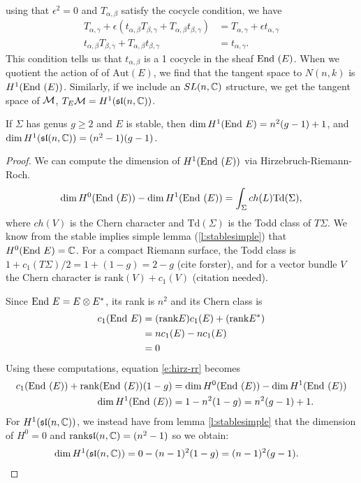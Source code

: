 	using that $\epsilon^2 = 0$ and $T_{\alpha,\beta}$ satisfy the cocycle condition, we have
	\begin{align*}
	T_{\alpha,\gamma} + \epsilon(t_{\alpha,\beta} T_{\beta,\gamma} + T_{\alpha,\beta} t_{\beta,\gamma}) &= T_{\alpha,\gamma} + \epsilon t_{\alpha,\gamma}\\
	t_{\alpha,\beta} T_{\beta,\gamma} + T_{\alpha,\beta} t_{\beta,\gamma} &= t_{\alpha,\gamma}.
	\end{align*}
	This condition tells us that $t_{\alpha,\beta}$ is a 1 cocycle in the sheaf $\text{End }(E)$. When we quotient the action of of $\text{Aut}(E)$, we find that the tangent space to $N(n,k)$ is $H^1(\text{End }(E))$. Similarly, if we include an $SL(n,\mathbb{C})$ structure, we get the tangent space of $\mathcal{M}$, $T_E\mathcal{M} = H^1(\mathfrak{sl}(n,\mathbb{C}))$.
	
	\begin{theorem}
		If $\Sigma$ has genus $g\geq 2$ and $E$ is stable, then $\dim H^1(\text{End } E) = n^2(g-1)+1$, and $\dim H^1(\mathfrak{sl}(n,\mathbb{C})) = (n^2-1)(g-1)$.
	\end{theorem}
	\begin{proof}
		We can compute the dimension of $H^1(\text{End }(E))$ via Hirzebruch-Riemann-Roch. 
		\begin{equation}
			\label{e:hirz-rr}
			\dim H^0(\text{End }(E)) - \dim H^1(\text{End }(E)) = \int_\Sigma ch(L)\text{Td}(\Sigma),
		\end{equation}
		where $ch(V)$ is the Chern character and $\text{Td}(\Sigma)$ is the Todd class of $T\Sigma$. We know from the stable implies simple lemma (\ref{l:stablesimple}) that $H^0(\text{End } E)=\mathbb{C}$. For a compact Riemann surface, the Todd class is $1+c_1(T\Sigma)/2 = 1+(1-g) = 2-g$ (cite forster), and for a vector bundle $V$ the Chern character is $\text{rank}(V) + c_1(V)$ (citation needed). 
		
		Since $\text{End } E = E\otimes E^\ast$, its rank is $n^2$ and its Chern class is
		\begin{align*}
			c_1(\text{End } E) &= (\text{rank} E) c_1(E) + (\text{rank} E^\ast)\\
			&= n c_1(E) - nc_1(E)\\
			&= 0
		\end{align*}
		Using these computations, equation \ref{e:hirz-rr} becomes 
		\begin{align*}
			c_1(\text{End }(E)) + \text{rank}(\text{End }(E))(1-g) &= \dim H^0(\text{End }(E)) - \dim H^1(\text{End }(E))\\
			\dim H^1(\text{End }(E)) &= 1 - n^2(1-g) = n^2(g-1) + 1.
		\end{align*}
		For $H^1(\mathfrak{sl}(n,\mathbb{C}))$, we instead have from lemma \ref{l:stablesimple} that the dimension of $H^0 = 0$ and $\text{rank}\mathfrak{sl}(n,\mathbb{C}) = (n^2-1)$ so we obtain:
		\begin{align*}
			\dim H^1(\mathfrak{sl}(n,\mathbb{C})) &=  0-(n-1)^2(1-g) = (n-1)^2(g-1).
		\end{align*}
	\end{proof}

